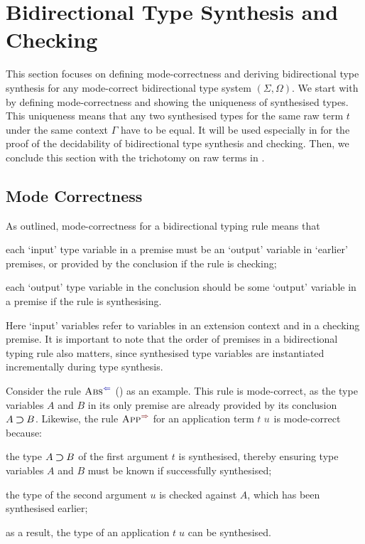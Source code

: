 
\section{Bidirectional Type Synthesis and Checking} \label{sec:type-synthesis}
This section focuses on defining mode-correctness and deriving bidirectional type synthesis for any mode-correct bidirectional type system $(\Sigma, \Omega)$.
We start with  by defining mode-correctness and showing the uniqueness of synthesised types.
This uniqueness means that any two synthesised types for the same raw term $t$ under the same context $\Gamma$ have to be equal.
It will be used especially in  for the proof of the decidability of bidirectional type synthesis and checking.
Then, we conclude this section with the trichotomy on raw terms in .

\subsection{Mode Correctness}\label{sec:mode-correctness}
As \citet{Dunfield2021} outlined, mode-correctness for a bidirectional typing rule means that 
\begin{enumerate*}
\item each `input' type variable in a premise must be an `output' variable in `earlier' premises, or provided by the conclusion if the rule is checking;
\item each `output' type variable in the conclusion should be some `output' variable in a premise if the rule is synthesising.
\end{enumerate*}
Here `input' variables refer to variables in an extension context and in a checking premise.
It is important to note that the order of premises in a bidirectional typing rule also matters, since synthesised type variables are instantiated incrementally during type synthesis.

Consider the rule $\ChkRule{Abs}$ () as an example.
This rule is mode-correct, as the type variables $A$ and $B$ in its only premise are already provided by its conclusion $A \mathbin{\bm{\supset}} B$.
Likewise, the rule $\SynRule{App}$ for an application term $\isTerm{t\;u}$ is mode-correct because:
\begin{enumerate*}
\item the type $A \mathbin{\bm{\supset}} B$ of the first argument $t$ is synthesised, thereby ensuring type variables $A$ and $B$ must be known if successfully synthesised;
\item the type of the second argument $u$ is checked against $A$, which has been synthesised earlier;
\item as a result, the type of an application $t\;u$ can be synthesised.
\end{enumerate*}

